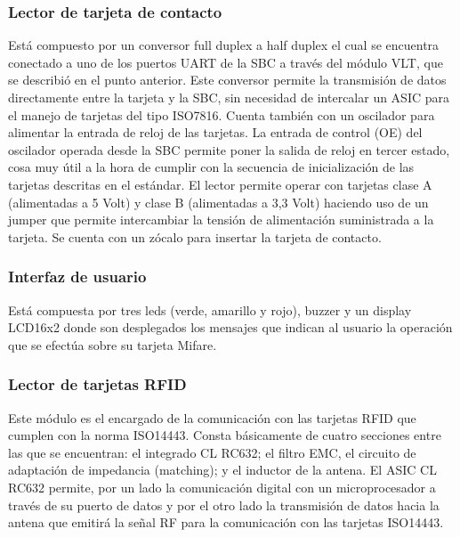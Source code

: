 \documentclass[%
        final,
        notitlepage,
        narroweqnarray,
        inline,
        ]{ieee}
\begin{document}
\subsubsection{Lector de tarjeta de contacto}

Está compuesto por un conversor full duplex a half duplex el cual se encuentra conectado a uno de los puertos UART de la SBC a través del módulo VLT, que se describió en el punto anterior. Este conversor permite la transmisión de datos directamente entre la tarjeta y la SBC, sin necesidad de intercalar un ASIC para el manejo de tarjetas del tipo ISO7816. Cuenta también con un oscilador para alimentar la entrada de reloj de las tarjetas. La entrada de control (OE) del oscilador operada desde la SBC permite poner la salida de reloj en tercer estado, cosa muy útil a la hora de cumplir con la secuencia de inicialización de las tarjetas descritas en el estándar. El lector permite operar con tarjetas clase A (alimentadas a 5 Volt) y clase B (alimentadas a 3,3 Volt) haciendo uso de un jumper que permite intercambiar la tensión de alimentación suministrada a la tarjeta. Se cuenta con un zócalo para insertar la tarjeta de contacto.


\subsubsection{Interfaz de usuario}

Está compuesta por tres leds (verde, amarillo y rojo), buzzer y un display LCD16x2 donde son desplegados los mensajes que indican al usuario la operación que se efectúa sobre su tarjeta Mifare.


\subsubsection{Lector de tarjetas RFID}

Este módulo es el encargado de la comunicación con las tarjetas RFID que cumplen con la norma ISO14443. Consta básicamente de cuatro secciones entre las que se encuentran: el integrado CL RC632; el filtro EMC, el circuito de adaptación de impedancia (matching); y el inductor de la antena. 
El ASIC CL RC632 permite, por un lado la comunicación digital con un microprocesador a través de su puerto de datos y por el otro lado la transmisión de datos hacia la antena que emitirá la señal RF para la comunicación con las tarjetas ISO14443.
\end{document}
